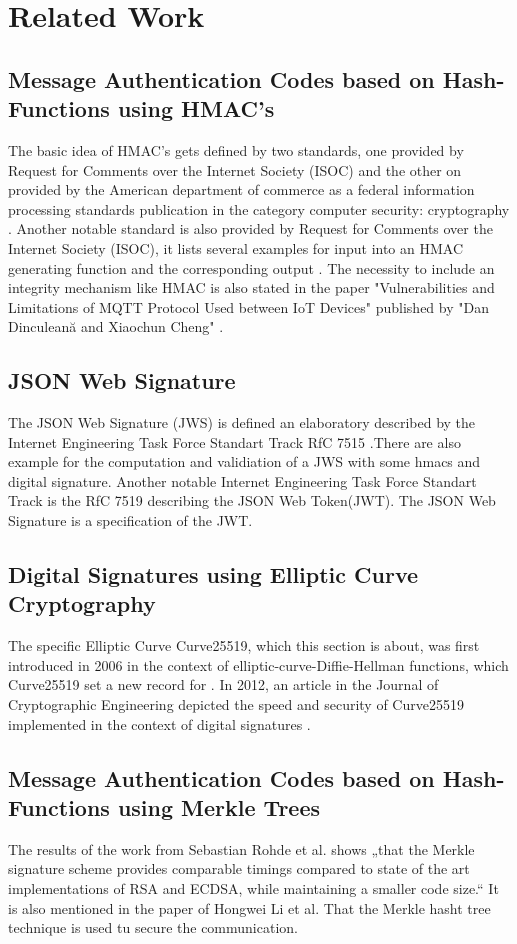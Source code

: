\section{Related Work}

\subsection{Message Authentication Codes based on Hash-Functions using HMAC's}

The basic idea of HMAC’s gets defined by two standards, one provided by Request for Comments over the Internet Society (ISOC) \cite{RFC} and the other on provided by the American department of commerce as a federal information processing standards publication in the category computer security: cryptography \cite{FIBS}. Another notable standard is also provided by Request for Comments over the Internet Society (ISOC), it lists several examples for input into an HMAC generating function and the corresponding output \cite{RFC2}. The necessity to include an integrity mechanism like HMAC is also stated in the paper "Vulnerabilities and Limitations of MQTT Protocol
Used between IoT Devices" published by "Dan Dinculeană and Xiaochun Cheng" \cite{LIMI}.

\subsection{JSON Web Signature}
The JSON Web Signature (JWS) is defined an elaboratory described by the Internet Engineering Task Force Standart Track RfC 7515 \cite{rfc7515}.There are also example for the computation and validiation of a JWS with some hmacs and digital signature. Another notable Internet Engineering Task Force Standart Track is the RfC 7519 \cite{rfc7519}describing the JSON Web Token(JWT). The JSON Web Signature is a specification of the JWT.

\subsection{Digital Signatures using Elliptic Curve Cryptography}
The specific Elliptic Curve Curve25519, which this section is about, was first introduced in 2006 in the context of elliptic-curve-Diffie-Hellman functions, which Curve25519 set a new record for \cite{ECDH}. In 2012, an article in the Journal of Cryptographic Engineering depicted the speed and security of Curve25519 implemented in the context of digital signatures \cite{Curve25519}.

\subsection{Message Authentication Codes based on Hash-Functions using Merkle Trees}
The results of the work from Sebastian Rohde et al. shows „that the Merkle signature scheme provides comparable timings compared to state of the art implementations of RSA and ECDSA, while maintaining a smaller code size.“ \cite{FHB} It is also mentioned in the paper of Hongwei Li et al. That the Merkle hasht tree technique is used tu secure the communication. \cite{METR}
